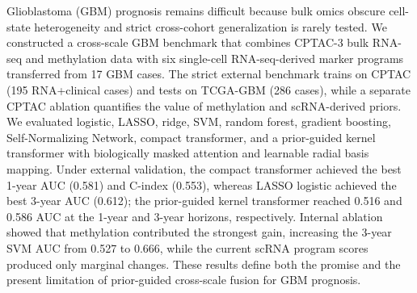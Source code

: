 Glioblastoma (GBM) prognosis remains difficult because bulk omics obscure cell-state heterogeneity and strict cross-cohort generalization is rarely tested. We constructed a cross-scale GBM benchmark that combines CPTAC-3 bulk RNA-seq and methylation data with six single-cell RNA-seq-derived marker programs transferred from 17 GBM cases. The strict external benchmark trains on CPTAC (195 RNA+clinical cases) and tests on TCGA-GBM (286 cases), while a separate CPTAC ablation quantifies the value of methylation and scRNA-derived priors. We evaluated logistic, LASSO, ridge, SVM, random forest, gradient boosting, Self-Normalizing Network, compact transformer, and a prior-guided kernel transformer with biologically masked attention and learnable radial basis mapping. Under external validation, the compact transformer achieved the best 1-year AUC (0.581) and C-index (0.553), whereas LASSO logistic achieved the best 3-year AUC (0.612); the prior-guided kernel transformer reached 0.516 and 0.586 AUC at the 1-year and 3-year horizons, respectively. Internal ablation showed that methylation contributed the strongest gain, increasing the 3-year SVM AUC from 0.527 to 0.666, while the current scRNA program scores produced only marginal changes. These results define both the promise and the present limitation of prior-guided cross-scale fusion for GBM prognosis.
